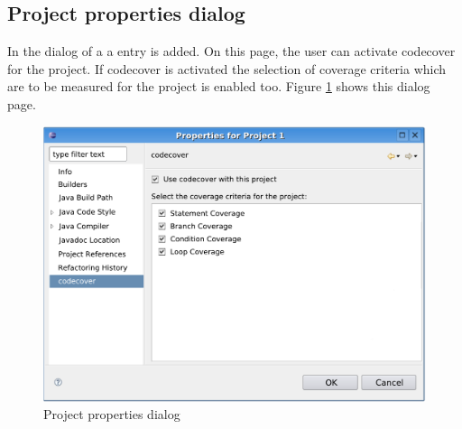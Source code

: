 \subsection{Project properties dialog} \label{ui:Project properties dialog}
In the  dialog of a  a \gbt entry is added. On this page, the user can activate codecover for the project. If codecover is activated the selection of coverage criteria which are to be measured for the project is enabled too. Figure \ref{ui_fg:Project properties dialog} shows this dialog page.
\begin{figure}[hbt]
 \centering
 \includegraphics[width=1.0\textwidth]{images/Project_Configuration_Dialog/Project_Configuration_Dialog}
 \caption{Project properties dialog}
 \label{ui_fg:Project properties dialog}
\end{figure}

\newpage

